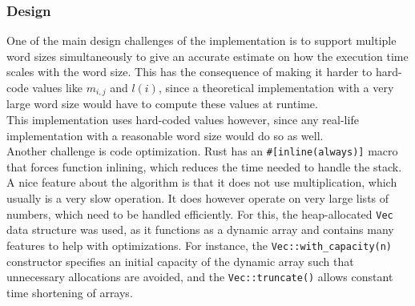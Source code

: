 \subsubsection{Design}
One of the main design challenges of the implementation is to support multiple word sizes simultaneously to give an accurate estimate on how the execution time scales with the word size. This has the consequence of making it harder to hard-code values like $m_{i, j}$ and $l(i)$, since a theoretical implementation with a very large word size would have to compute these values at runtime.\\
This implementation uses hard-coded values however, since any real-life implementation with a reasonable word size would do so as well.\\
Another challenge is code optimization. Rust has an \texttt{\#[inline(always)]} macro that forces function inlining, which reduces the time needed to handle the stack.
A nice feature about the algorithm is that it does not use multiplication, which usually is a very slow operation. It does however operate on very large lists of numbers, which need to be handled efficiently. For this, the heap-allocated \texttt{Vec} data structure was used, as it functions as a dynamic array and contains many features to help with optimizations. For instance, the \texttt{Vec::with\_capacity(n)} constructor specifies an initial capacity of the dynamic array such that unnecessary allocations are avoided, and the \texttt{Vec::truncate()} allows constant time shortening of arrays\cite{rust-lang}.\\

